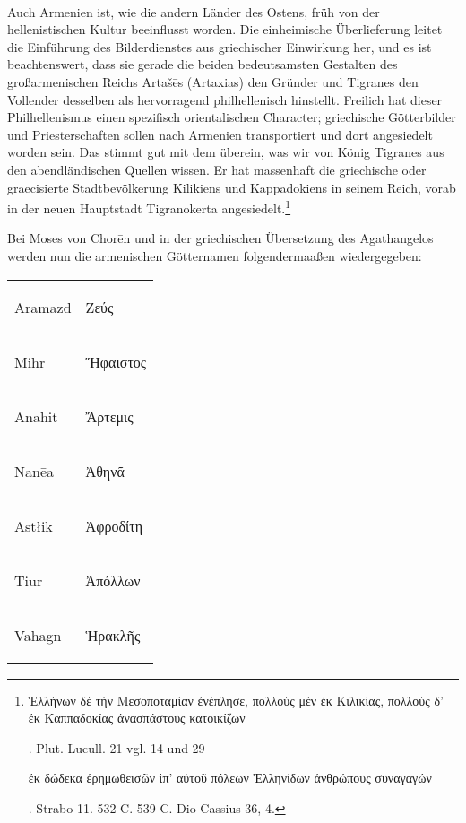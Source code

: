 \documentclass{article}
\begin{document}
\paragraph{}
Auch Armenien ist, wie die andern Länder des Ostens, früh von der hellenistischen Kultur beeinflusst worden. Die einheimische Überlieferung leitet die Einführung des Bilderdienstes aus griechischer Einwirkung her, und es ist beachtenswert, dass sie gerade die beiden bedeutsamsten Gestalten des großarmenischen Reichs Artašēs (Artaxias) den Gründer und Tigranes den Vollender desselben als hervorragend philhellenisch hinstellt. Freilich hat dieser Philhellenismus einen spezifisch orientalischen Character; griechische Götterbilder und Priesterschaften sollen nach Armenien transportiert und dort angesiedelt worden sein. Das stimmt gut mit dem überein, was wir von König Tigranes aus den abendländischen Quellen wissen. Er hat massenhaft die griechische oder graecisierte Stadtbevölkerung Kilikiens und Kappadokiens in seinem Reich, vorab in der neuen Hauptstadt Tigranokerta angesiedelt.\footnote{\begin{greek}Ἑλλήνων δὲ τὴν Μεσοποταμίαν ἐνέπλησε, πολλοὺς μὲν ἐκ Κιλικίας, πολλοὺς δ' ἐκ Καππαδοκίας ἀνασπάστους κατοικίζων\end{greek}. Plut. Lucull. 21 vgl. 14 und 29 \begin{greek}ἐκ δώδεκα ἐρημωθεισῶν ἱπ' αὐτοῦ πόλεων Ἑλληνίδων ἀνθρώπους συναγαγών\end{greek}. Strabo 11. 532 C. 539 C. Dio Cassius 36, 4.}

Bei Moses von Chorēn und in der griechischen Übersetzung des Agathangelos werden nun die armenischen Götternamen folgendermaaßen wiedergegeben:

\begin{table}[H]
    \centering
    \small
    \bfseries
    \begin{tabular}{l l}
        Aramazd  &  \begin{greek}Ζεύς\end{greek}      \\
         Mihr     &  \begin{greek}Ἥφαιστος\end{greek}  \\
         Anahit   &  \begin{greek}Ἄρτεμις\end{greek}   \\
         Nanēa    &  \begin{greek}Ἀθηνᾶ\end{greek}     \\ 
         Astłik   &  \begin{greek}Ἀφροδίτη\end{greek}  \\
         Tiur     &  \begin{greek}Ἀπόλλων\end{greek}   \\
         Vahagn   &  \begin{greek}Ἡρακλῆς\end{greek} \\
    \end{tabular}
\end{table}
\end{document}
